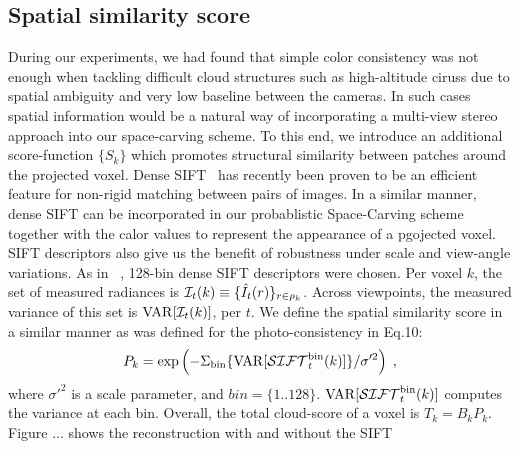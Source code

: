 \documentclass[runningheads]{llncs}
\begin{document}
\subsection*{Spatial similarity score}
\label{sec:appearancecore}

During our experiments, we had found that simple color consistency was not enough when tackling difficult cloud structures such as high-altitude ciruss due to spatial ambiguity and very low baseline between the cameras. In such cases spatial information would be a natural way of incorporating a multi-view stereo approach into our space-carving scheme.
To this end, we introduce an additional score-function $\{S_k\}$ which promotes  structural similarity between patches around the projected voxel.
Dense SIFT~\cite{DenseSift2011} has recently been proven to be an efficient feature for non-rigid matching between pairs of images.
In a similar manner, dense SIFT can be incorporated in our probablistic Space-Carving scheme together with the calor values to represent the appearance of a pgojected voxel. SIFT descriptors also give us the benefit of robustness under scale and view-angle variations.
As in ~\cite{DenseSift2011}, 128-bin dense SIFT descriptors were chosen.
Per voxel $k$, the set of measured radiances is \mbox{${\cal I}_t(k)\equiv\{\hat I_t(r)\}_{r\in\rho_k}$}. Across viewpoints, the measured variance of this set is ${\rm VAR}[{\cal I}_t(k)]$, per $t$. We define the spatial similarity score in a similar manner as was defined for the photo-consistency in Eq.10:
\begin{equation}
 P_k= \exp\left(
         -\Sigma_{\rm bin}\{{\rm VAR}[{\cal SIFT}_t^{\rm bin}(k)]\}/\sigma'^2
         \right)
  \;,
 \label{eq:Dist}
\end{equation}
where $\sigma'^2$ is a scale parameter, and $bin=\{1..128\}$. ${\rm VAR}[{\cal SIFT}_t^{\rm bin}(k)]$ computes the variance at each bin. Overall, the total cloud-score of a voxel is $T_k=B_kP_k$.
Figure ... shows the reconstruction with and without the SIFT 








\end{document}
